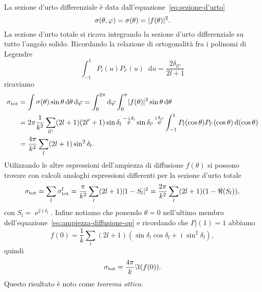 \documentclass[a4paper,fleqn,twoside,12pt]{article}
\renewcommand{\phi}{\varphi}
\newcommand*{\dd}{\mathop{}\!\mathrm{d}} %
\DeclareMathOperator{\e}{\mathrm{e}} %
\DeclareMathOperator{\uimm}{\mathrm{i}} %
\DeclarePairedDelimiter{\abs}{\lvert}{\rvert}
\begin{document}
La sezione d'urto differenziale è data dall'equazione~\eqref{eq:sezione-d'urto}
\begin{equation}
  \sigma(\theta,\phi) = \sigma(\theta) = \abs{f(\theta)}^{2}.
\end{equation}
La sezione d'urto totale si ricava integrando la sezione d'urto differenziale su
tutto l'angolo solido.  Ricordando la relazione di ortogonalità fra i polinomi
di Legendre
\begin{equation}
  \int_{-1}^{1}P_{l}(u)P_{l'}(u)\dd u = \frac{2\delta_{ll'}}{2l+1}
\end{equation}
ricaviamo
\begin{equation}
  \begin{split}
    \sigma_{\textup{tot}} &= \int \sigma(\theta) \sin\theta\dd\theta\dd\phi =
    \int_{0}^{2\pi}\dd \phi \int_{0}^{\pi} \abs{f(\theta)}^{2} \sin\theta
    \dd\theta \\
    &= 2\pi \frac{1}{k^{2}} \sum_{ll'}(2l+1)(2l'+1) \sin\delta_{l} \e^{-\uimm
      \delta_{l}} \sin\delta_{l'}\e^{\uimm \delta_{l'}}
    \int_{-1}^{1}P_{l}(\cos\theta)P_{l'}(\cos\theta) \dd(\cos\theta) \\
    &= \frac{4\pi}{k^{2}} \sum_{l}(2l+1)\sin^{2}\delta_{l}.
  \end{split}
\end{equation}
Utilizzando le altre espressioni dell'ampiezza di diffusione $f(\theta)$ si
possono trovare con calcoli analoghi espressioni differenti per la sezione
d'urto totale
\begin{equation}
  \sigma_{\textup{tot}} = \sum_{l} \sigma_{\textup{tot}}^{l} =
  \frac{\pi}{k^{2}} \sum_{l}(2l+1)\abs{1 - S_{l}}^{2} = \frac{2\pi}{k^{2}}
  \sum_{l}(2l+1)(1-\Re(S_{l})),
\end{equation}
con $S_{l} = \e^{2\uimm\delta_{l}}$.  Infine notiamo che ponendo $\theta = 0$
nell'ultimo membro dell'equazione~\eqref{eq:ampiezza-diffusione-op} e ricordando
che $P_{l}(1) = 1$ abbiamo
\begin{equation}
  f(0) = \frac{1}{k} \sum_{l}(2l+1)(\sin\delta_{l}\cos\delta_{l} + \uimm
  \sin^{2}\delta_{l}),
\end{equation}
quindi
\begin{equation}
  \sigma_{\textup{tot}} = \frac{4\pi}{k} \Im(f(0)).
\end{equation}
Questo risultato è noto come \emph{teorema ottico}.
\end{document}
